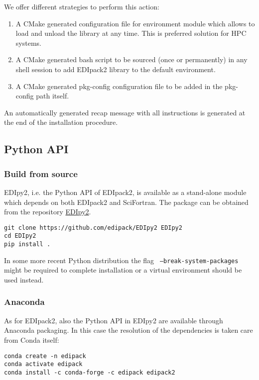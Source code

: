 \documentclass[preprint,3p,10pt]{elsarticle}
\def\NAME{{\rm EDIpack2 }}
\begin{document}
We offer different strategies to perform this action:
\begin{enumerate}
\item  A CMake generated configuration file for environment module
  which allows to load and unload the library at any time. This is
  preferred solution for HPC systems. 
\item A CMake generated bash script to be sourced (once or
  permanently) in any shell session to add \NAME library to the
  default environment.
\item A CMake generated pkg-config configuration file to be added in
  the pkg-config path itself.  
\end{enumerate}
An automatically generated recap message with all instructions is
generated at the end of the installation procedure. 



\subsection{Python API}
\subsubsection{Build from source}
EDIpy2, i.e. the Python API of EDIpack2, is available as a stand-alone
module which depends on both \NAME and SciFortran. The package can be
obtained from the repository
\href{https://github.com/EDIpack/EDIpy2.0}{EDIpy2}.

\begin{lstlisting}[style=mybash]
git clone https://github.com/edipack/EDIpy2 EDIpy2
cd EDIpy2
pip install . 
\end{lstlisting}
In some more recent Python distribution the flag {\tt
  --break-system-packages} might be required to complete
installation or a virtual environment should be used instead. 

\subsubsection{Anaconda}
As for EDIpack2, also the Python API in EDIpy2 are available through
Anaconda packaging. In this case the resolution of the dependencies is
taken care from Conda itself:

\begin{lstlisting}[style=mybash]
conda create -n edipack
conda activate edipack
conda install -c conda-forge -c edipack edipack2
\end{lstlisting}
\end{document}
